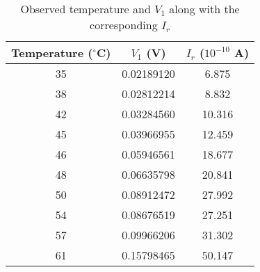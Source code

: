 \begin{table}[]
    \centering
    \begin{tabular}{|c|c|c|} \hline
    Temperature ($^\circ$C) & $V_1$ (V) & $I_r$ ($10^{-10}$ A) \\ \hline
    35 & 0.02189120 & 6.875 \\ 
    38 & 0.02812214 & 8.832 \\ 
    42 & 0.03284560 & 10.316 \\ 
    45 & 0.03966955 & 12.459 \\ 
    46 & 0.05946561 & 18.677 \\ 
    48 & 0.06635798 & 20.841 \\ 
    50 & 0.08912472 & 27.992 \\ 
    54 & 0.08676519 & 27.251 \\ 
    57 & 0.09966206 & 31.302 \\ 
    61 & 0.15798465 & 50.147 \\ \hline
    \end{tabular}
    \caption{Observed temperature and $V_1$ along with the corresponding $I_r$}
\label{tab}
\end{table}